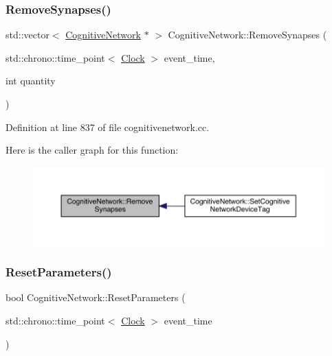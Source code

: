 \subsubsection{\texorpdfstring{Remove\+Synapses()}{RemoveSynapses()}}
{\footnotesize\ttfamily std\+::vector$<$ \hyperlink{class_cognitive_network}{Cognitive\+Network} $\ast$ $>$ Cognitive\+Network\+::\+Remove\+Synapses (\begin{DoxyParamCaption}\item[{std\+::chrono\+::time\+\_\+point$<$ \hyperlink{universe_8h_a0ef8d951d1ca5ab3cfaf7ab4c7a6fd80}{Clock} $>$}]{event\+\_\+time,  }\item[{int}]{quantity }\end{DoxyParamCaption})}



Definition at line 837 of file cognitivenetwork.\+cc.

Here is the caller graph for this function\+:
\nopagebreak
\begin{figure}[H]
\begin{center}
\leavevmode
\includegraphics[width=350pt]{class_cognitive_network_a87d6628f388baed1edb8efda9062c443_icgraph}
\end{center}
\end{figure}
\mbox{\label{class_cognitive_network_a8af8ed2605263e57a32e457aba2af99d}} 
\subsubsection{\texorpdfstring{Reset\+Parameters()}{ResetParameters()}}
{\footnotesize\ttfamily bool Cognitive\+Network\+::\+Reset\+Parameters (\begin{DoxyParamCaption}\item[{std\+::chrono\+::time\+\_\+point$<$ \hyperlink{universe_8h_a0ef8d951d1ca5ab3cfaf7ab4c7a6fd80}{Clock} $>$}]{event\+\_\+time }\end{DoxyParamCaption})}



